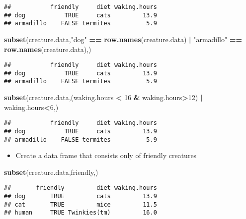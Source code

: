 \documentclass[]{article}
\newenvironment{Shaded}{\begin{snugshade}}{\end{snugshade}}
\newcommand{\KeywordTok}[1]{\textcolor[rgb]{0.13,0.29,0.53}{\textbf{#1}}}
\newcommand{\DecValTok}[1]{\textcolor[rgb]{0.00,0.00,0.81}{#1}}
\newcommand{\StringTok}[1]{\textcolor[rgb]{0.31,0.60,0.02}{#1}}
\newcommand{\OperatorTok}[1]{\textcolor[rgb]{0.81,0.36,0.00}{\textbf{#1}}}
\newcommand{\NormalTok}[1]{#1}
\providecommand{\tightlist}{%
  \setlength{\itemsep}{0pt}\setlength{\parskip}{0pt}}
\begin{document}
\begin{verbatim}
##           friendly     diet waking.hours
## dog           TRUE     cats         13.9
## armadillo    FALSE termites          5.9
\end{verbatim}

\begin{Shaded}
\begin{Highlighting}[]
\KeywordTok{subset}\NormalTok{(creature.data,}\StringTok{"dog"} \OperatorTok{==}\StringTok{ }\KeywordTok{row.names}\NormalTok{(creature.data) }\OperatorTok{|}\StringTok{ "armadillo"} \OperatorTok{==}\StringTok{ }\KeywordTok{row.names}\NormalTok{(creature.data),)}
\end{Highlighting}
\end{Shaded}

\begin{verbatim}
##           friendly     diet waking.hours
## dog           TRUE     cats         13.9
## armadillo    FALSE termites          5.9
\end{verbatim}

\begin{Shaded}
\begin{Highlighting}[]
\KeywordTok{subset}\NormalTok{(creature.data,(waking.hours }\OperatorTok{<}\StringTok{ }\DecValTok{16} \OperatorTok{&}\StringTok{ }\NormalTok{waking.hours}\OperatorTok{>}\DecValTok{12}\NormalTok{) }\OperatorTok{|}\StringTok{ }\NormalTok{waking.hours}\OperatorTok{<}\DecValTok{6}\NormalTok{,)}
\end{Highlighting}
\end{Shaded}

\begin{verbatim}
##           friendly     diet waking.hours
## dog           TRUE     cats         13.9
## armadillo    FALSE termites          5.9
\end{verbatim}

\begin{itemize}
\tightlist
\item
  Create a data frame that consists only of friendly creatures
\end{itemize}

\begin{Shaded}
\begin{Highlighting}[]
\KeywordTok{subset}\NormalTok{(creature.data,friendly,)}
\end{Highlighting}
\end{Shaded}

\begin{verbatim}
##       friendly         diet waking.hours
## dog       TRUE         cats         13.9
## cat       TRUE         mice         11.5
## human     TRUE Twinkies(tm)         16.0
\end{verbatim}
\end{document}
